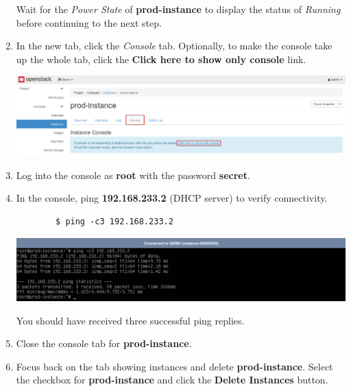\documentclass[letterpaper, 12pt]{article}
\begin{document}
\begin{enumerate}
    \begin{stopbox}
        Wait for the \textit{Power State} of \textbf{prod-instance} to display the status of \textit{Running} before
        continuing to the next step.
    \end{stopbox}

    \item In the new tab, click the \textit{Console} tab. Optionally, to make the console take up the whole tab, click
    the \textbf{Click here to show only console} link.
    
    \begin{center}
        \includegraphics[width=\linewidth]{images/part1/step11.png}
    \end{center}

    \item Log into the console as \textbf{root} with the password \textbf{secret}.

    \item In the console, ping \textbf{192.168.233.2} (DHCP server) to verify connectivity.
    \begin{lstlisting}
        $ ping -c3 192.168.233.2
    \end{lstlisting}

    \begin{center}
        \includegraphics[width=\linewidth]{images/part1/step13.png}
    \end{center}

    \begin{notebox}
        You should have received three successful ping replies.
    \end{notebox}

    \item Close the console tab for \textbf{prod-instance}.

    \item Focus back on the tab showing instances and delete \textbf{prod-instance}. Select the checkbox for
    \textbf{prod-instance} and click the \textbf{Delete Instances} button.


\end{enumerate}
\end{document}
